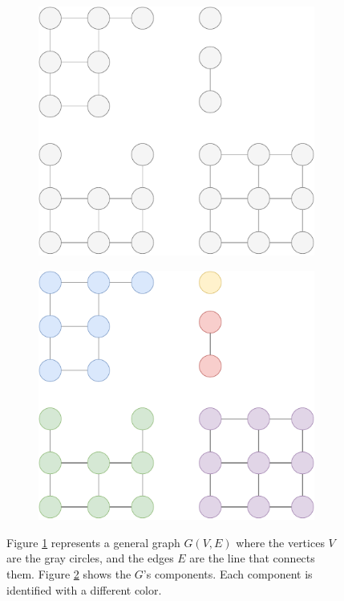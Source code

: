 \documentclass[a4paper,12pt]{report}
\begin{document}
\begin{appendices}
\begin{figure}
    \centering
    \begin{subfigure}[b]{0.45\textwidth}
        \centering
        \includegraphics[width=\textwidth]{figures/Graph.pdf}
        \caption{}
        \label{fig:Ca}
    \end{subfigure}
    \hfill
    \begin{subfigure}[b]{0.45\textwidth}
        \centering
        \includegraphics[width=\textwidth]{figures/Components.pdf}
        \caption{}
        \label{fig:Cb}
    \end{subfigure}
    \caption{Figure \ref{fig:Ca} represents a general graph $G(V, E)$ where the vertices $V$ are the gray circles, and the edges $E$ are the line that connects them. Figure \ref{fig:Cb} shows the $G$'s components. Each component is identified with a different color.}
    \label{fig:components}
\end{figure}


\end{appendices}
\end{document}
